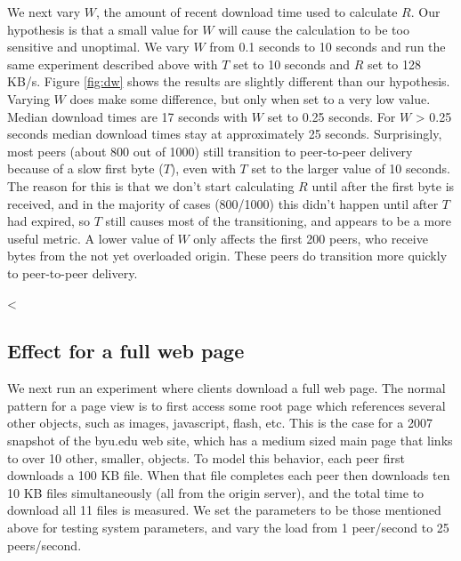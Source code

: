 We next vary $W$, the amount of recent download time used to calculate $R$. Our hypothesis is that 
a small value for $W$ will cause the calculation to be too sensitive and unoptimal. We vary $W$ from 0.1 seconds 
to 10 seconds and run the same experiment described above with $T$ set to 10 seconds and $R$ set to 128 KB/s. Figure \ref{fig:dw} shows the results are 
slightly different than our hypothesis. Varying $W$ does make some difference, but only when set 
to a very low value. Median download times are 17 seconds with $W$ set to 0.25 seconds. For $W$ \textgreater{} 0.25 seconds
median download times stay at approximately 25 seconds. Surprisingly, 
most peers (about 800 out of 1000) still transition to peer-to-peer delivery because of 
a slow first byte ($T$), even with $T$ set to the larger value of 10 seconds. 
The reason for this is that we don't start calculating $R$ until after the first byte is received, and 
in the majority of cases (800/1000) this didn't happen until after $T$ had expired, so $T$ still 
causes most of the transitioning, and appears to be a more useful metric. A lower value of $W$ only affects the first 
200 peers, who receive bytes from the not yet overloaded origin.  These peers do transition more quickly to peer-to-peer delivery.



<%

\subsection{Effect for a full web page}

We next run an experiment where clients download a full web page.  The normal pattern for a page view 
is to first access some root page which references several other objects, such as images, 
javascript, flash, etc. This is the case for a 2007 snapshot of the byu.edu web site, which has a medium sized main page that 
links to over 10 other, smaller, objects.  To model this behavior, each peer first 
downloads a 100 KB file. When that file completes each peer then downloads ten 10 KB files simultaneously 
(all from the origin server), and the total time to download all 11 files is measured. We set the parameters 
to be those mentioned above for testing system parameters, and vary the load from 1 peer/second to 25 peers/second. 

